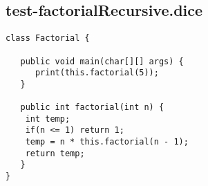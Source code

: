 \subsection{test-factorialRecursive.dice}
\begin{verbatim}
class Factorial {

   public void main(char[][] args) {
      print(this.factorial(5));
   }

   public int factorial(int n) {
    int temp;
    if(n <= 1) return 1;
    temp = n * this.factorial(n - 1);
    return temp;
   }
}

\end{verbatim}